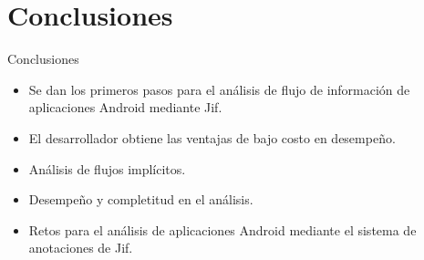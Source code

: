  \section{Conclusiones}
	
\begin{frame}{Conclusiones}
\begin{block}{}
	\begin{itemize}
		\item Se dan los primeros pasos para el análisis de flujo de
		información de aplicaciones Android mediante Jif.\pause
		\item El desarrollador obtiene las ventajas de bajo costo en desempeño.
		\item Análisis de flujos implícitos.\pause
		\item Desempeño y completitud en el análisis.\pause
		\item Retos para el análisis de aplicaciones Android mediante el sistema de
		anotaciones de Jif.
	\end{itemize}
\end{block}
\end{frame}